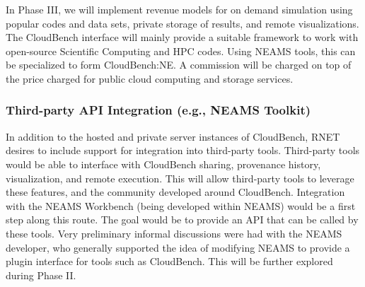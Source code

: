 In Phase III, we will implement revenue models for on demand simulation using 
popular codes and data sets, private storage of results, and remote 
visualizations. The CloudBench interface will mainly provide a suitable 
framework to work with open-source Scientific Computing and HPC codes. Using 
NEAMS tools, this can be specialized to form CloudBench:NE. A commission will 
be charged on top of the price charged for public cloud computing and storage 
services. 

\subsubsection{Third-party API Integration (e.g., NEAMS Toolkit)}
In addition to the hosted and private server instances of CloudBench,
RNET desires to include support for integration into third-party
tools. Third-party tools would be able to interface with CloudBench
sharing, provenance history, visualization, and remote execution. This will allow
third-party tools to leverage these features, and the community
developed around CloudBench. Integration with the NEAMS Workbench
(being developed within NEAMS) would be a first step along this
route. The goal would be to provide an API that can be called by these
tools. Very preliminary informal discussions were had with the NEAMS
developer, who generally supported the idea of modifying NEAMS to
provide a plugin interface for tools such as CloudBench. This will be
further explored during Phase II.

%
%
%


